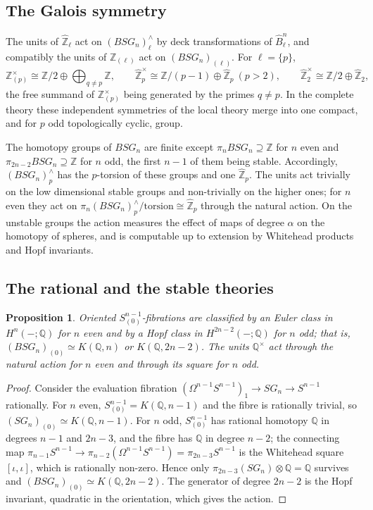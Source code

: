 \documentclass[11pt]{amsart}
\theoremstyle{plain}
\newtheorem{proposition}[theorem]{Proposition}
\theoremstyle{definition}
\numberwithin{equation}{section}
\newcommand{\Z}{\mathbb{Z}}
\newcommand{\Q}{\mathbb{Q}}
\newcommand{\Zhat}{\widehat{\mathbb{Z}}}
\newcommand{\Zl}{\mathbb{Z}_{(\ell)}}
\newcommand{\Zp}{\mathbb{Z}_{(p)}}
\newcommand{\units}{^{\times}}
\begin{document}
\subsection{The Galois symmetry}
The units of $\Zhat_\ell$ act on $(BSG_n)^\wedge_\ell$ by deck transformations of $\widehat B^n_\ell$, and compatibly the units of $\Zl$ act on $(BSG_n)_{(\ell)}$.
For $\ell=\{p\}$,
\[
\Zp\units\cong\Z/2\oplus\bigoplus_{q\ne p}\Z,\qquad \Zhat_p\units\cong\Z/(p-1)\oplus\Zhat_p\ (p>2),\qquad \Zhat_2\units\cong\Z/2\oplus\Zhat_2,
\]
the free summand of $\Zp\units$ being generated by the primes $q\ne p$.
In the complete theory these independent symmetries of the local theory merge into one compact, and for $p$ odd topologically cyclic, group.

The homotopy groups of $BSG_n$ are finite except $\pi_nBSG_n\supseteq\Z$ for $n$ even and $\pi_{2n-2}BSG_n\supseteq\Z$ for $n$ odd, the first $n-1$ of them being stable.
Accordingly, $(BSG_n)^\wedge_p$ has the $p$-torsion of these groups and one $\Zhat_p$.
The units act trivially on the low dimensional stable groups and non-trivially on the higher ones; for $n$ even they act on $\pi_n(BSG_n)^\wedge_p/\mathrm{torsion}\cong\Zhat_p$ through the natural action.
On the unstable groups the action measures the effect of maps of degree $\alpha$ on the homotopy of spheres, and is computable up to extension by Whitehead products and Hopf invariants.

\subsection{The rational and the stable theories}

\begin{proposition}\label{prop:rationalspherical}
Oriented $S^{n-1}_{(0)}$-fibrations are classified by an Euler class in $H^n(-;\Q)$ for $n$ even and by a Hopf class in $H^{2n-2}(-;\Q)$ for $n$ odd; that is, $(BSG_n)_{(0)}\simeq K(\Q,n)$ or $K(\Q,2n-2)$.
The units $\Q\units$ act through the natural action for $n$ even and through its square for $n$ odd.
\end{proposition}

\begin{proof}
Consider the evaluation fibration $(\Omega^{n-1}S^{n-1})_1\to SG_n\to S^{n-1}$ rationally.
For $n$ even, $S^{n-1}_{(0)}=K(\Q,n-1)$ and the fibre is rationally trivial, so $(SG_n)_{(0)}\simeq K(\Q,n-1)$.
For $n$ odd, $S^{n-1}_{(0)}$ has rational homotopy $\Q$ in degrees $n-1$ and $2n-3$, and the fibre has $\Q$ in degree $n-2$; the connecting map $\pi_{n-1}S^{n-1}\to\pi_{n-2}(\Omega^{n-1}S^{n-1})=\pi_{2n-3}S^{n-1}$ is the Whitehead square $[\iota,\iota]$, which is rationally non-zero.
Hence only $\pi_{2n-3}(SG_n)\otimes\Q=\Q$ survives and $(BSG_n)_{(0)}\simeq K(\Q,2n-2)$.
The generator of degree $2n-2$ is the Hopf invariant, quadratic in the orientation, which gives the action.
\end{proof}
\end{document}
